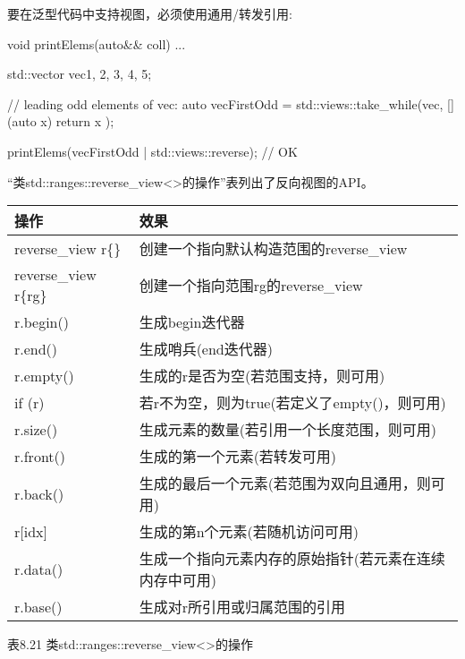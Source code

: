 要在泛型代码中支持视图，必须使用通用/转发引用:

\begin{cpp}
void printElems(auto&& coll) {
	...
}

std::vector vec{1, 2, 3, 4, 5};

// leading odd elements of vec:
auto vecFirstOdd = std::views::take_while(vec, [](auto x) {
							return x %
						});

printElems(vecFirstOdd | std::views::reverse); // OK
\end{cpp}



“类std::ranges::reverse\_view<>的操作”表列出了反向视图的API。

\begin{longtable}[c]{|l|l|}
\hline
\textbf{操作}    & \textbf{效果}                                                \\ \hline
\endfirsthead
%
\endhead
%
reverse\_view r\{\} & 创建一个指向默认构造范围的reverse\_view                                 \\ \hline
reverse\_view r\{rg\} & 创建一个指向范围rg的reverse\_view                \\ \hline
r.begin()             & 生成begin迭代器                                      \\ \hline
r.end()               & 生成哨兵(end迭代器)                             \\ \hline
r.empty()             & 生成的r是否为空(若范围支持，则可用) \\ \hline
if (r)                & 若r不为空，则为true(若定义了empty()，则可用)       \\ \hline
r.size()            & 生成元素的数量(若引用一个长度范围，则可用)                              \\ \hline
r.front()             & 生成的第一个元素(若转发可用)              \\ \hline
r.back()              & 生成的最后一个元素(若范围为双向且通用，则可用) \\ \hline
r{[}idx{]}            & 生成的第n个元素(若随机访问可用)            \\ \hline
r.data()            & 生成一个指向元素内存的原始指针(若元素在连续内存中可用) \\ \hline
r.base()              & 生成对r所引用或归属范围的引用       \\ \hline
\end{longtable}

\begin{center}
表8.21 类std::ranges::reverse\_view<>的操作
\end{center}

